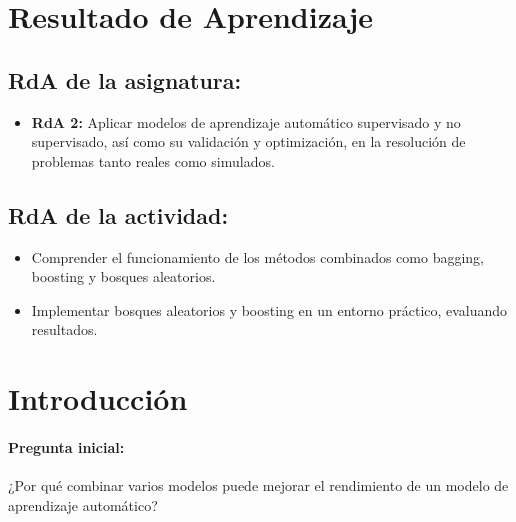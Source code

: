 \documentclass[a4,11pt]{aleph-notas}
\begin{document}
\encabezado


\section*{Resultado de Aprendizaje}

\subsection*{RdA de la asignatura:}
\begin{itemize}[leftmargin=*]
    \item \textbf{RdA 2:} Aplicar modelos de aprendizaje automático supervisado y no supervisado, así como su validación y optimización, en la resolución de problemas tanto reales como simulados.
\end{itemize}

\subsection*{RdA de la actividad:}
\begin{itemize}[leftmargin=*]
    \item Comprender el funcionamiento de los métodos combinados como bagging, boosting y bosques aleatorios.  
    \item Implementar bosques aleatorios y boosting en un entorno práctico, evaluando resultados.  
\end{itemize}

\section*{Introducción}

\paragraph{Pregunta inicial:} 
¿Por qué combinar varios modelos puede mejorar el rendimiento de un modelo de aprendizaje automático?  
\end{document}
